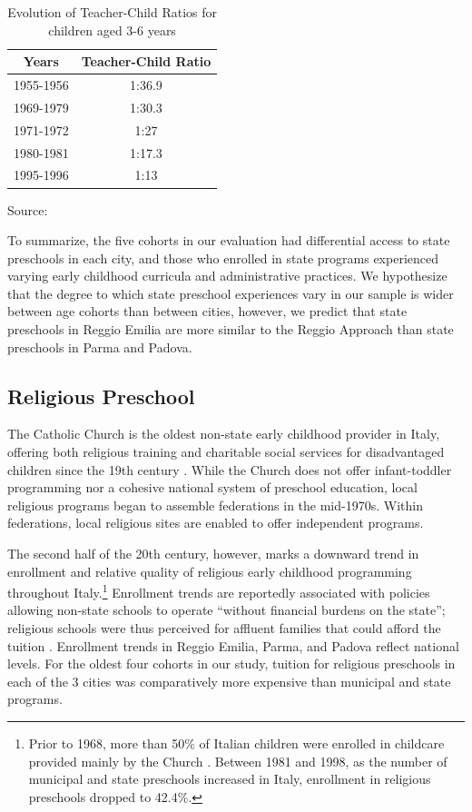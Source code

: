 \begin{table}
\begin{center}
\caption{Evolution of Teacher-Child Ratios for children aged 3-6 years}
\label{tab:ratios}
\begin{tabular}{c c}
\toprule
Years & \multicolumn{1}{C{7em}}{Teacher-Child Ratio} \\
\midrule
1955-1956 & 1:36.9 \\
1969-1979 & 1:30.3 \\
1971-1972 & 1:27 \\
1980-1981 & 1:17.3 \\
1995-1996 & 1:13 \\
\bottomrule
\end{tabular}
\end{center}
\small
Source: \citet {Hohnerlein_2015_Development-and-Diffusion}
\end{table}

To summarize, the five cohorts in our evaluation had differential access to state preschools in each city, and those who enrolled in state programs experienced varying early childhood curricula and administrative practices. We hypothesize that the degree to which state preschool experiences vary in our sample is wider between age cohorts than between cities, however, we predict that state preschools in Reggio Emilia are more similar to the Reggio Approach than state preschools in Parma and Padova. 

\subsection{Religious Preschool}

The Catholic Church is the oldest non-state early childhood provider in Italy, offering both religious training and charitable social services for disadvantaged children since the 19th century \citep{OECD_2001_Italy-Country-Note}. While the Church does not offer infant-toddler programming nor a cohesive national system of preschool education, local religious programs began to assemble federations in the mid-1970s. Within federations, local religious sites are enabled to offer independent programs. 

The second half of the 20th century, however, marks a downward trend in enrollment and relative quality of religious early childhood programming throughout Italy.\footnote{Prior to 1968, more than 50\% of Italian children were enrolled in childcare provided mainly by the Church \citep{Hohnerlein_2009_Paradox-Public-Preschools}. Between 1981 and 1998, as the number of municipal and state preschools increased in Italy, enrollment in religious preschools dropped to 42.4\%.} Enrollment trends are reportedly associated with policies allowing non-state schools to operate ``without financial burdens on the state''; religious schools were thus perceived for affluent families that could afford the tuition \citep{Ribolzi_2013_Italy,Hohnerlein_2009_Paradox-Public-Preschools}. Enrollment trends in Reggio Emilia, Parma, and Padova reflect national levels. For the oldest four cohorts in our study, tuition for religious preschools in each of the 3 cities was comparatively more expensive than municipal and state programs. 

